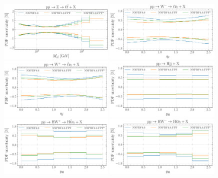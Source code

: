 \begin{figure}[t]
\centering
\includegraphics[width=0.49\textwidth]{plots/LHCpheno/NNPDF_DY_14TEV_40_PHENO-global.pdf}
\includegraphics[width=0.49\textwidth]{plots/LHCpheno/NNPDF_WM_14TEV_40_PHENO-global.pdf}
\includegraphics[width=0.49\textwidth]{plots/LHCpheno/NNPDF_WP_14TEV_40_PHENO-global.pdf}
\includegraphics[width=0.49\textwidth]{plots/LHCpheno/NNPDF_HVBF_14TEV_40_PHENO-global.pdf}
\includegraphics[width=0.49\textwidth]{plots/LHCpheno/NNPDF_HWP_14TEV_40_PHENO-global.pdf}
\includegraphics[width=0.49\textwidth]{plots/LHCpheno/NNPDF_HWM_14TEV_40_PHENO-global.pdf}

\end{figure}
